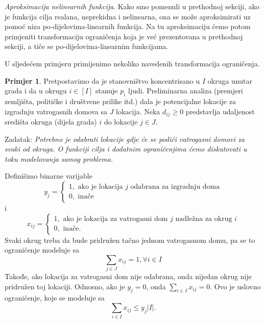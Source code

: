 \documentclass[a4paper, utf8, 11pt, colorlinks]{book}
\theoremstyle{definition}
\newtheorem{primjer}{Primjer}[chapter]
\begin{document}

\emph{Aproksimacija nelinearnih funkcija}. Kako smo pomenuli u prethodnoj sekciji, ako je funkcija cilja realana, neprekidna i nelinearna, ona se može aproksimirati uz pomoć  niza po-dijelovima-linearnih funkcija. Na tu aproksimaciju ćemo potom primjeniti transformaciju ograničenja koja je već prezentovana u prethodnoj sekciji, a tiče se po-dijelovima-linearnim funkcijama. 

U sljedećem primjeru primijenimo nekoliko navedenih transformacija ograničenja.


\begin{primjer} Pretpostavimo da je stanovništvo koncentrisano u $I$ okruga  unutar grada i da u okrugu $i\in [I]$ stanuje $p_i$ ljudi. Preliminarna analiza (premjeri zemljišta, političke i društvene prilike itd.) dala je potencijalne lokacije za izgradnju vatrogasnih domova sa $J$ lokacija. Neka $d_{ij} \geq 0$ predstavlja udaljenost   središta okruga (dijela grada) $i$  do lokacije $j \in J $. 
\end{primjer}
Zadatak: \emph{Potrebno je odabrati lokacije gdje će se podići vatrogasni domovi za svaki od okruga. O funkciji cilja i dodatnim ograničenjima ćemo diskutovati u toku modelovanja samog problema.}

Definišimo binarne varijable 
$$y_j = \begin{cases}
              1, \mbox{ ako je lokacija } j \mbox{ odabrana za izgradnju doma} \\
              0, \mbox{ inače}
        \end{cases}$$
i 
$$
x_{ij}= \begin{cases}
             1, \mbox{ ako je lokacija za vatrogasni dom } j \mbox{ nadležna za okrug } i \\
             0, \mbox{ inače}. 
        \end{cases}
$$
Svaki okrug treba da bude pridružen tačno jednom vatrogasnom domu, pa se to ograničenje modeluje sa
\begin{equation}\label{eq:ex-constr-1}
      \sum_{j \in J} x_{ij} = 1, \forall i \in I
\end{equation}
Takođe, ako lokacija za vatrogasni dom nije odabrana, onda nijedan okrug nije pridružen toj lokaciji. Odnosno, ako je $y_j = 0$, onda $ \sum_{i \in I} x_{ij} = 0$. Ovo je uslovno ograničenje, koje se modeluje sa
\begin{equation}\label{eq:ex-constr-2}
    \sum_{i \in I} x_{ij} \leq y_j |I|.
 \end{equation}
\end{document}
